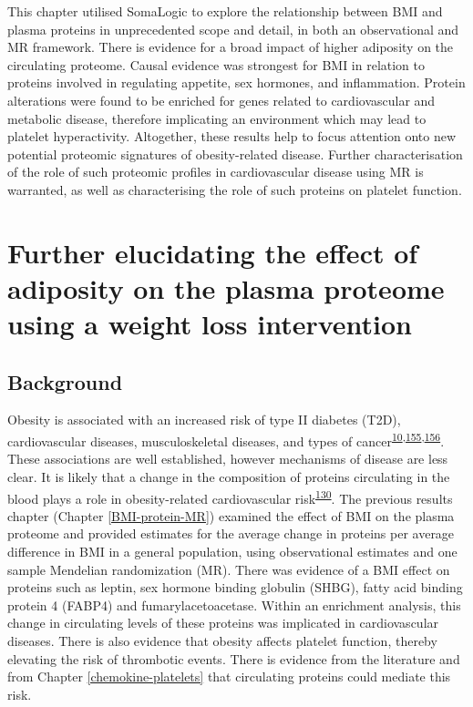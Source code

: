 \documentclass[11pt,twoside]{bristolthesis}
\begin{document}
This chapter utilised SomaLogic to explore the relationship between BMI and plasma proteins in unprecedented scope and detail, in both an observational and MR framework. There is evidence for a broad impact of higher adiposity on the circulating proteome. Causal evidence was strongest for BMI in relation to proteins involved in regulating appetite, sex hormones, and inflammation. Protein alterations were found to be enriched for genes related to cardiovascular and metabolic disease, therefore implicating an environment which may lead to platelet hyperactivity. Altogether, these results help to focus attention onto new potential proteomic signatures of obesity-related disease. Further characterisation of the role of such proteomic profiles in cardiovascular disease using MR is warranted, as well as characterising the role of such proteins on platelet function.

\hypertarget{BMI-protein-RCT}{%
\chapter{Further elucidating the effect of adiposity on the plasma proteome using a weight loss intervention}\label{BMI-protein-RCT}}

\hypertarget{background-4}{%
\section{Background}\label{background-4}}

Obesity is associated with an increased risk of type II diabetes (T2D), cardiovascular diseases, musculoskeletal diseases, and types of cancer\textsuperscript{\protect\hyperlink{ref-Khan2018}{10},\protect\hyperlink{ref-Garg2014}{155},\protect\hyperlink{ref-Kortt2002}{156}}. These associations are well established, however mechanisms of disease are less clear. It is likely that a change in the composition of proteins circulating in the blood plays a role in obesity-related cardiovascular risk\textsuperscript{\protect\hyperlink{ref-Goudswaard2021}{130}}. The previous results chapter (Chapter \ref{BMI-protein-MR}) examined the effect of BMI on the plasma proteome and provided estimates for the average change in proteins per average difference in BMI in a general population, using observational estimates and one sample Mendelian randomization (MR). There was evidence of a BMI effect on proteins such as leptin, sex hormone binding globulin (SHBG), fatty acid binding protein 4 (FABP4) and fumarylacetoacetase. Within an enrichment analysis, this change in circulating levels of these proteins was implicated in cardiovascular diseases. There is also evidence that obesity affects platelet function, thereby elevating the risk of thrombotic events. There is evidence from the literature and from Chapter \ref{chemokine-platelets} that circulating proteins could mediate this risk.
\end{document}
